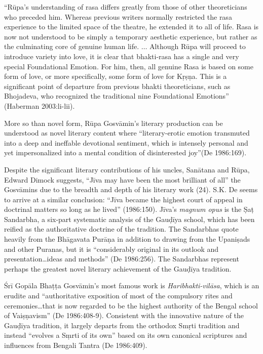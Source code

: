 \begin{myquote}
\eleven
“Rūpa’s understanding of rasa differs greatly from those of other theoreticians who preceded him. Whereas previous writers normally restricted the rasa experience to the limited space of the theatre, he extended it to all of life. Rasa is now not understood to be simply a temporary aesthetic experience, but rather as the culminating core of genuine human life. $\ldots$ Although Rūpa will proceed to introduce variety into love, it is clear that bhakti-rasa has a single and very special Foundational Emotion. For him, then, all genuine Rasa is based on some form of love, or more specifically, some form of love for Kṛṣṇa. This is a significant point of departure from previous bhakti theoreticians, such as Bhojadeva, who recognized the traditional nine Foundational Emotions”  \hfill 	(Haberman 2003:li-lii). 
\end{myquote}
\vskip 3pt

More so than novel form, Rūpa Gosvāmin’s literary production can be understood as novel literary content where “literary-erotic emotion transmuted into a deep and ineffable devotional sentiment, which is intensely personal and yet impersonalized into a mental condition of disinterested joy”(De 1986:169). 

Despite the significant literary contributions of his uncles, Sanātana and Rūpa, Edward Dimock suggests, “Jīva may have been the most brilliant of all” the Gosvāmins due to the breadth and depth of his literary work (24). S.K. De seems to arrive at a similar conclusion: “Jīva became the highest court of appeal in doctrinal matters so long as he lived” (1986:150). Jīva’s {\sl magnum opus} is the Ṣaṭ Sandarbha, a six-part systematic analysis of the Gauḍīya school, which has been reified as the authoritative doctrine of the tradition. The Sandarbhas quote heavily from the Bhāgavata Purāṇa in addition to drawing from the Upaniṣads and other Puranas, but it is “considerably original in its outlook and presentation…ideas and methods” (De 1986:256). The Sandarbhas represent perhaps the greatest novel literary achievement of the Gauḍīya tradition.  

Śrī Gopāla Bhaṭṭa Gosvāmin’s most famous work is {\sl Haribhakti-vilāsa}, which is an erudite and “authoritative exposition of most of the compulsory rites and ceremonies…that is now regarded to be the highest authority of the Bengal school of Vaiṣṇavism” (De 1986:408-9). Consistent with the innovative nature of the Gauḍīya tradition, it largely departs from the orthodox Smṛti tradition and instead “evolves a Sṃrti of its own” based on its own canonical scriptures and influences from Bengali Tantra (De 1986:409). 

